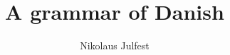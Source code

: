 \title{A grammar of Danish}  %
\subtitle{}
\author{Nikolaus Julfest}
\renewcommand{\lsISBNdigital}{000-0-000000-00-0}
\renewcommand{\lsISBNhardcover}{000-0-000000-00-0}
\renewcommand{\lsISBNsoftcover}{000-0-000000-00-0}
\renewcommand{\lsSeries}{sidl} %
\renewcommand{\lsSeriesNumber}{23} %
 